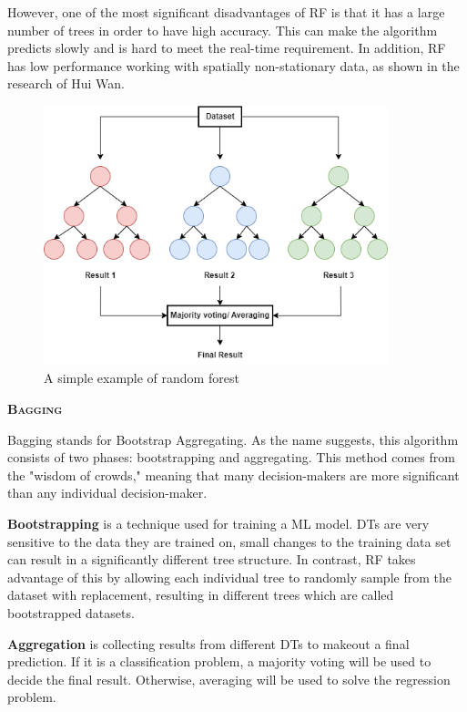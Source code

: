 \documentclass[a4paper, 12pt]{report}
\begin{document}
 However, one of the most significant disadvantages of RF is that it has a large number of trees in order to have high accuracy. This can make the algorithm predicts slowly and is hard to meet the real-time requirement. In addition, RF has low performance working with spatially non-stationary data, as shown in the research of Hui Wan.

\begin{center}
    \begin{figure}[H]
        \begin{center}
            \includegraphics[width=10cm]{picture/algo/rf.drawio.png}
        \end{center}
        \caption{A simple example of random forest}
        \label{ref Figure}
    \end{figure}
\end{center}

\textsc{\textbf{Bagging}}\cite{dkdN}

Bagging stands for Bootstrap Aggregating. As
the name suggests, this algorithm consists of two phases: bootstrapping and aggregating. This method comes from the "wisdom of crowds," meaning that many decision-makers are more significant than any individual decision-maker.

\textbf{Bootstrapping} is a technique used for training a ML model. DTs are very sensitive to the data they are trained on, small changes to the training data set can result in a significantly different tree structure. In contrast, RF takes advantage of this by allowing each individual tree to randomly sample from the dataset with replacement, resulting in different trees which are called bootstrapped datasets.

\textbf{Aggregation} is collecting results from different DTs to makeout a final prediction. If it is a classification problem, a majority voting will be used to decide the final result. Otherwise, averaging will be used to solve the regression problem.\\
\end{document}

